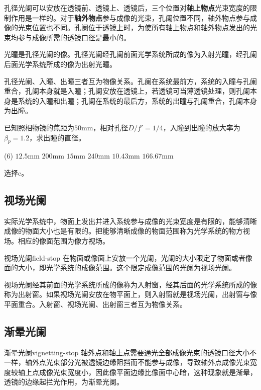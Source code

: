 \documentclass[cn,10pt,chinesefont=founder,math=newtx,cite=super,twoside]{elegantbook}
\begin{document}
孔径光阑可以安放在透镜前、透镜上、透镜后，三个位置对\textbf{轴上物点}光束宽度的限制作用是一样的。对于\textbf{轴外物点}参与成像的光束，孔阑位置不同，轴外物点参与成像的光束位置也不同。孔阑位于透镜上时，为使所有轴上物点和轴外物点发出的光束均参与成像所需的透镜口径是最小的。

光瞳是孔径光阑的像。孔径光阑经孔阑前面光学系统所成的像为入射光瞳，经孔阑后面光学系统所成的像为出射光瞳。

孔径光阑、入瞳、出瞳三者互为物像关系。孔阑在系统最前方，系统的入瞳与孔阑重合，孔阑本身就是入瞳；孔阑安放在透镜上，若透镜可当薄透镜处理，则孔阑本身是系统的入瞳和出瞳；孔阑在系统的最后方，系统的出瞳与孔阑重合，孔阑本身为出瞳。

\begin{problem}
	已知照相物镜的焦距为$50\mathrm{mm}$，相对孔径$D/f'=1/4$，入瞳到出瞳的放大率为$\beta_p=1.2$，求出瞳的直径。 
	\begin{tasks}(6)
		\task $12.5\mathrm{mm}$
		\task $200\mathrm{mm}$
		\task $15\mathrm{mm}$
		\task $240\mathrm{mm}$
		\task $10.43\mathrm{mm}$
		\task $166.67\mathrm{mm}$
	\end{tasks}
\end{problem}
\begin{solution}
	选择c。
\end{solution}

\subsection{视场光阑}
\label{subsect:field-stop}
实际光学系统中，物面上发出并进入系统参与成像的光束宽度是有限的，能够清晰成像的物面大小也是有限的。把能够清晰成像的物面范围称为光学系统的物方视场。相应的像面范围为像方视场。

\begin{definition}{视场光阑}{field-stop}
	在物面或像面上安放一个光阑，光阑的大小限定了物面或者像面的大小，即光学系统的成像范围。这个限定成像范围的光阑为视场光阑。
\end{definition}

视场光阑经其前面的光学系统所成的像称为入射窗，经其后面的光学系统所成的像称为出射窗。如果视场光阑安放在物平面上，则入射窗就是视场光阑，出射窗与像平面重合。入射窗、视场光阑、出射窗三者互为物像关系。

\subsection{渐晕光阑}
\label{subsect:vignetting-stop}
\begin{definition}{渐晕光阑}{vignetting-stop}
轴外点和轴上点需要通光全部成像光束的透镜口径大小不一样，轴外点光束部分光被透镜边缘阻挡而不能参与成像，导致轴外点成像光束宽度较轴上点成像光束宽度小，因此像平面边缘比像面中心暗，这种现象就是渐晕，透镜的边缘起拦光作用，为渐晕光阑。
\end{definition}
\end{document}
